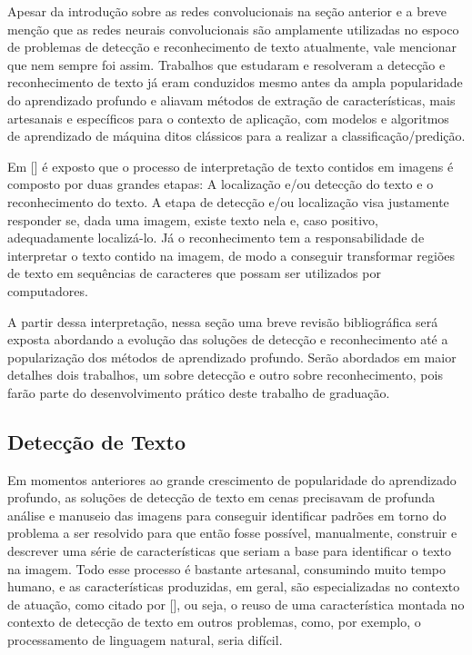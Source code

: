 Apesar da introdução sobre as redes convolucionais na seção anterior e a breve menção que as redes neurais convolucionais são amplamente utilizadas no 
espoco de problemas de detecção e reconhecimento de texto atualmente, vale mencionar que nem sempre foi assim. Trabalhos que estudaram e resolveram a 
detecção e reconhecimento de texto já eram conduzidos mesmo antes da ampla popularidade do aprendizado profundo e aliavam métodos de extração de características, 
mais artesanais e específicos para o contexto de aplicação, com modelos e algoritmos de aprendizado de máquina ditos clássicos para a realizar a classificação/predição.

Em [] é exposto que o processo de interpretação de texto contidos em imagens é composto por duas grandes etapas: A 
localização e/ou detecção do texto e o reconhecimento do texto. A etapa de detecção e/ou localização visa justamente responder se, dada uma imagem, 
existe texto nela e, caso positivo, adequadamente localizá-lo. Já o reconhecimento tem a responsabilidade de interpretar o texto contido na imagem, de 
modo a conseguir transformar regiões de texto em sequências de caracteres que possam ser utilizados por computadores.

A partir dessa interpretação, nessa seção uma breve revisão bibliográfica será exposta abordando a evolução das soluções de detecção e reconhecimento 
até a popularização dos métodos de aprendizado profundo. Serão abordados em maior detalhes dois trabalhos, um sobre detecção e outro sobre reconhecimento, 
pois farão parte do desenvolvimento prático deste trabalho de graduação.


\subsection{Detecção de Texto}
Em momentos anteriores ao grande crescimento de popularidade do aprendizado profundo, as soluções de detecção de texto em cenas precisavam de profunda 
análise e manuseio das imagens para conseguir identificar padrões em torno do problema a ser resolvido para que então fosse possível, manualmente, construir 
e descrever uma série de características que seriam a base para identificar o texto na imagem. Todo esse processo é bastante artesanal, consumindo muito 
tempo humano, e as características produzidas, em geral, são especializadas no contexto de atuação, como citado por [], 
ou seja, o reuso de uma característica montada no contexto de detecção de texto em outros problemas, como, por exemplo, o processamento de linguagem natural, 
seria difícil.

